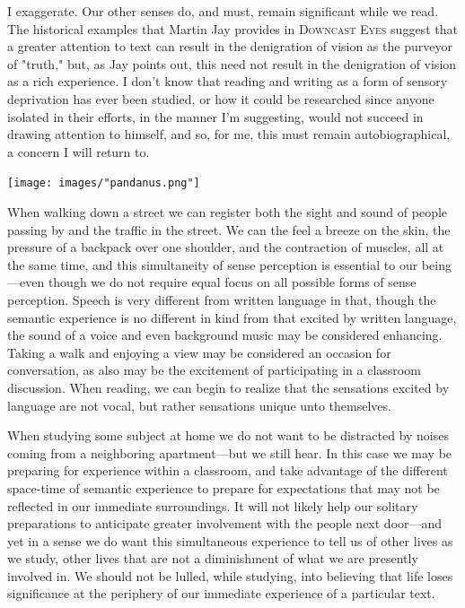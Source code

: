\documentclass[
]{memoir}
\begin{document}
I exaggerate. Our other senses do, and must, remain significant while we
read. The historical examples that Martin Jay provides in
\textsc{Downcast Eyes} suggest that a greater attention to text can
result in the denigration of vision as the purveyor of "truth," but, as
Jay points out, this need not result in the denigration of vision as a
rich experience. I don't know that reading and writing as a form of
sensory deprivation has ever been studied, or how it could be researched
since anyone isolated in their efforts, in the manner I'm suggesting,
would not succeed in drawing attention to himself, and so, for me, this
must remain autobiographical, a concern I will return to.

\begin{center}\texttt{[image: images/"pandanus.png"]}\end{center}

When walking down a street we can register both the sight and sound of
people passing by and the traffic in the street. We can the feel a
breeze on the skin, the pressure of a backpack over one shoulder, and
the contraction of muscles, all at the same time, and this simultaneity
of sense perception is essential to our being---even though we do not
require equal focus on all possible forms of sense perception. Speech is
very different from written language in that, though the semantic
experience is no different in kind from that excited by written
language, the sound of a voice and even background music may be
considered enhancing. Taking a walk and enjoying a view may be
considered an occasion for conversation, as also may be the excitement
of participating in a classroom discussion. When reading, we can begin
to realize that the sensations excited by language are not vocal, but
rather sensations unique unto themselves.

When studying some subject at home we do not want to be distracted by
noises coming from a neighboring apartment---but we still hear. In this
case we may be preparing for experience within a classroom, and take
advantage of the different space-time of semantic experience to prepare
for expectations that may not be reflected in our immediate
surroundings. It will not likely help our solitary preparations to
anticipate greater involvement with the people next door---and yet in a
sense we do want this simultaneous experience to tell us of other lives
as we study, other lives that are not a diminishment of what we are
presently involved in. We should not be lulled, while studying, into
believing that life loses significance at the periphery of our immediate
experience of a particular text.
\end{document}
